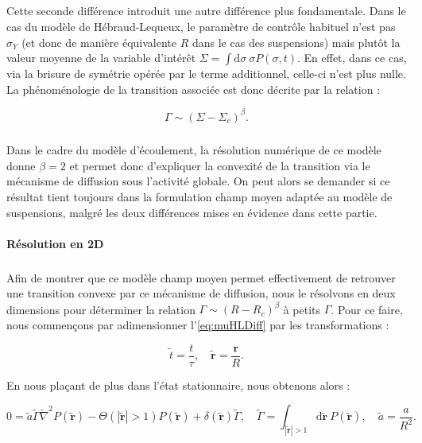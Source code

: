 \subparagraph{}Cette seconde différence introduit une autre différence plus fondamentale. Dans le cas du modèle de Hébraud-Lequeux, le paramètre de contrôle habituel n'est pas $\sigma_Y$ (et donc de manière équivalente $R$ dans le cas des suspensions) mais plutôt la valeur moyenne de la variable d'intérêt $\Sigma = \int \mathrm{d}\sigma~\sigma P(\sigma,t)$. En effet, dans ce cas, via la brisure de symétrie opérée par le terme additionnel, celle-ci n'est plus nulle. La phénoménologie de la transition associée est donc décrite par la relation :

\begin{equation}
	\Gamma \sim (\Sigma - \Sigma_c)^\beta.
	\label{eq:paramordre_HL}
\end{equation}

\subparagraph{}Dans le cadre du modèle d'écoulement, la résolution numérique de ce modèle donne $\beta=2$ et permet donc d'expliquer la convexité de la transition via le mécanisme de diffusion sous l'activité globale. On peut alors se demander si ce résultat tient toujours dans la formulation champ moyen adaptée au modèle de suspensions, malgré les deux différences mises en évidence dans cette partie.

\paragraph{Résolution en 2D}

\subparagraph{}Afin de montrer que ce modèle champ moyen permet effectivement de retrouver une transition convexe par ce mécanisme de diffusion, nous le résolvons en deux dimensions pour déterminer la relation $\Gamma \sim (R - R_c)^\beta$ à petits $\Gamma$. Pour ce faire, nous commençons par adimensionner l'\autoref{eq:muHLDiff} par les transformations :

\begin{equation}
	\tilde{t} = \frac{t}{\tau}, \quad \tilde{\mathbf{r}} = \frac{\mathbf{r}}{R}.
\end{equation}

\noindent En nous plaçant de plus dans l'état stationnaire, nous obtenons alors :

\begin{equation}
    0 = \tilde{a}\tilde{\Gamma}\tilde{\nabla}^2 P(\tilde{\mathbf{r}}) - \Theta(|\tilde{\mathbf{r}}|>1)P(\tilde{\mathbf{r}}) + \delta(\tilde{\mathbf{r}})\tilde{\Gamma}, \quad \tilde{\Gamma} = \int_{|\tilde{\mathbf{r}}|>1}\mathrm{d}\tilde{\mathbf{r}}~P(\tilde{\mathbf{r}}),\quad \tilde{a} = \frac{a}{R^2}.
\end{equation} 

